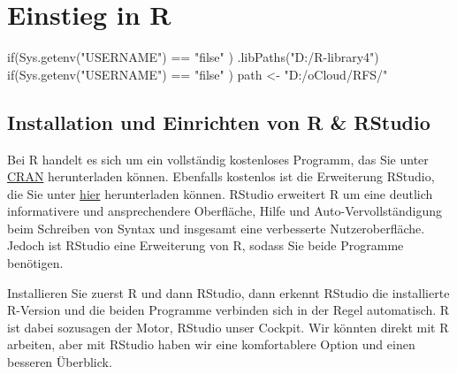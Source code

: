 \documentclass[
  letterpaper,
  DIV=11,
  numbers=noendperiod]{scrreprt}
\newenvironment{Shaded}{\begin{snugshade}}{\end{snugshade}}
\newcommand{\ControlFlowTok}[1]{\textcolor[rgb]{0.00,0.46,0.62}{#1}}
\newcommand{\FunctionTok}[1]{\textcolor[rgb]{0.28,0.35,0.67}{#1}}
\newcommand{\NormalTok}[1]{\textcolor[rgb]{0.00,0.46,0.62}{#1}}
\newcommand{\OtherTok}[1]{\textcolor[rgb]{0.00,0.46,0.62}{#1}}
\newcommand{\SpecialCharTok}[1]{\textcolor[rgb]{0.37,0.37,0.37}{#1}}
\newcommand{\StringTok}[1]{\textcolor[rgb]{0.13,0.47,0.30}{#1}}
\begin{document}
\hypertarget{einstieg-in-r}{%
\chapter{Einstieg in R}\label{einstieg-in-r}}

\begin{Shaded}
\begin{Highlighting}[]
\ControlFlowTok{if}\NormalTok{(}\FunctionTok{Sys.getenv}\NormalTok{(}\StringTok{"USERNAME"}\NormalTok{) }\SpecialCharTok{==} \StringTok{"filse"}\NormalTok{ ) }\FunctionTok{.libPaths}\NormalTok{(}\StringTok{"D:/R{-}library4"}\NormalTok{)}
\ControlFlowTok{if}\NormalTok{(}\FunctionTok{Sys.getenv}\NormalTok{(}\StringTok{"USERNAME"}\NormalTok{) }\SpecialCharTok{==} \StringTok{"filse"}\NormalTok{ ) path }\OtherTok{\textless{}{-}} \StringTok{"D:/oCloud/RFS/"}
\end{Highlighting}
\end{Shaded}

\hypertarget{installation-und-einrichten-von-r-rstudio}{%
\section{Installation und Einrichten von R \&
RStudio}\label{installation-und-einrichten-von-r-rstudio}}

Bei R handelt es sich um ein vollständig kostenloses Programm, das Sie
unter \href{https://cran.r-project.org/}{CRAN} herunterladen können.
Ebenfalls kostenlos ist die Erweiterung RStudio, die Sie unter
\href{https://www.rstudio.com/products/rstudio/download/\#download}{hier}
herunterladen können. RStudio erweitert R um eine deutlich informativere
und ansprechendere Oberfläche, Hilfe und Auto-Vervollständigung beim
Schreiben von Syntax und insgesamt eine verbesserte Nutzeroberfläche.
Jedoch ist RStudio eine Erweiterung von R, sodass Sie beide Programme
benötigen.

\begin{tcolorbox}[standard jigsaw,leftrule=.75mm, bottomtitle=1mm, rightrule=.15mm, opacitybacktitle=0.6, toprule=.15mm, titlerule=0mm, toptitle=1mm, colbacktitle=quarto-callout-note-color!10!white, bottomrule=.15mm, arc=.35mm, coltitle=black, left=2mm, title=\textcolor{quarto-callout-note-color}{\faInfo}\hspace{0.5em}{Note}, colframe=quarto-callout-note-color-frame, opacityback=0, colback=white]
Installieren Sie zuerst R und dann RStudio, dann erkennt RStudio die
installierte R-Version und die beiden Programme verbinden sich in der
Regel automatisch. R ist dabei sozusagen der Motor, RStudio unser
Cockpit. Wir könnten direkt mit R arbeiten, aber mit RStudio haben wir
eine komfortablere Option und einen besseren Überblick.
\end{tcolorbox}
\end{document}
